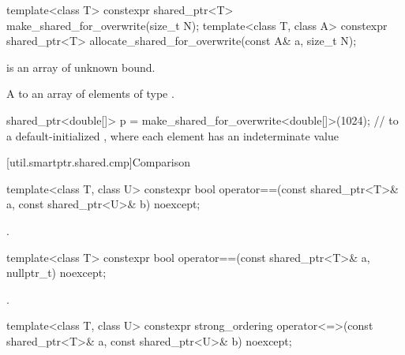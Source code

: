 %
%
\begin{itemdecl}
template<class T>
  constexpr shared_ptr<T> make_shared_for_overwrite(size_t N);
template<class T, class A>
  constexpr shared_ptr<T> allocate_shared_for_overwrite(const A& a, size_t N);
\end{itemdecl}

\begin{itemdescr}
\pnum
\constraints
{} is an array of unknown bound.

\pnum
\returns
A  to an array of
 elements of type .

\pnum
\begin{example}
\begin{codeblock}
shared_ptr<double[]> p = make_shared_for_overwrite<double[]>(1024);
  //  to a default-initialized , where each element has an indeterminate value
\end{codeblock}
\end{example}
\end{itemdescr}

[util.smartptr.shared.cmp]{Comparison}

%
\begin{itemdecl}
template<class T, class U>
  constexpr bool operator==(const shared_ptr<T>& a, const shared_ptr<U>& b) noexcept;
\end{itemdecl}

\begin{itemdescr}
\pnum
\returns
{}.
\end{itemdescr}

%
\begin{itemdecl}
template<class T>
  constexpr bool operator==(const shared_ptr<T>& a, nullptr_t) noexcept;
\end{itemdecl}

\begin{itemdescr}
\pnum
\returns
{}.
\end{itemdescr}

%
\begin{itemdecl}
template<class T, class U>
  constexpr strong_ordering operator<=>(const shared_ptr<T>& a, const shared_ptr<U>& b) noexcept;
\end{itemdecl}

